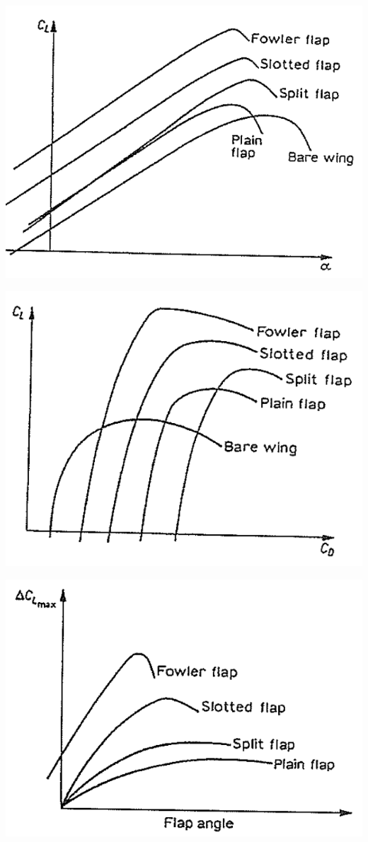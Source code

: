 	\begin{center}
	\begin{minipage}{0.25\textwidth}
	\includegraphics[scale=0.3]{ch5/5}
	\end{minipage}
	\begin{minipage}{0.25\textwidth}
	\includegraphics[scale=0.35]{ch5/6}
	\end{minipage}
	\begin{minipage}{0.3\textwidth}
	\includegraphics[scale=0.4]{ch5/7}

\end{minipage}
\end{center}
